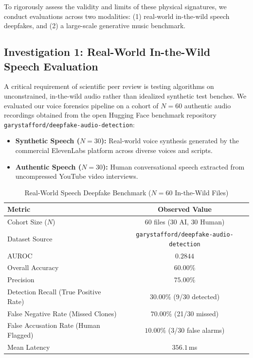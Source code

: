 \documentclass[conference]{IEEEtran}
\theoremstyle{definition}
\begin{document}
To rigorously assess the validity and limits of these physical signatures, we conduct evaluations across two modalities: (1) real-world in-the-wild speech deepfakes, and (2) a large-scale generative music benchmark.

\subsection{Investigation 1: Real-World In-the-Wild Speech Evaluation}

A critical requirement of scientific peer review is testing algorithms on unconstrained, in-the-wild audio rather than idealized synthetic test benches. We evaluated our voice forensics pipeline on a cohort of $N=60$ authentic audio recordings obtained from the open Hugging Face benchmark repository \texttt{garystafford/deepfake-audio-detection}:
\begin{itemize}
    \item \textbf{Synthetic Speech ($N=30$):} Real-world voice synthesis generated by the commercial ElevenLabs platform across diverse voices and scripts.
    \item \textbf{Authentic Speech ($N=30$):} Human conversational speech extracted from uncompressed YouTube video interviews.
\end{itemize}

\begin{table}[h]
\caption{Real-World Speech Deepfake Benchmark ($N=60$ In-the-Wild Files)}
\label{tab:speech_realworld}
\centering
\begin{tabular}{lc}
\toprule
\textbf{Metric} & \textbf{Observed Value} \\
\midrule
Cohort Size ($N$) & $60$ files ($30$ AI, $30$ Human) \\
Dataset Source & \texttt{garystafford/deepfake-audio-detection} \\
AUROC & $\mathbf{0.2844}$ \\
Overall Accuracy & $\mathbf{60.00\%}$ \\
Precision & $75.00\%$ \\
Detection Recall (True Positive Rate) & $\mathbf{30.00\%}$ (9/30 detected) \\
False Negative Rate (Missed Clones) & $\mathbf{70.00\%}$ (21/30 missed) \\
False Accusation Rate (Human Flagged) & $\mathbf{10.00\%}$ (3/30 false alarms) \\
Mean Latency & $356.1$\,ms \\
\bottomrule
\end{tabular}
\end{table}
\end{document}
